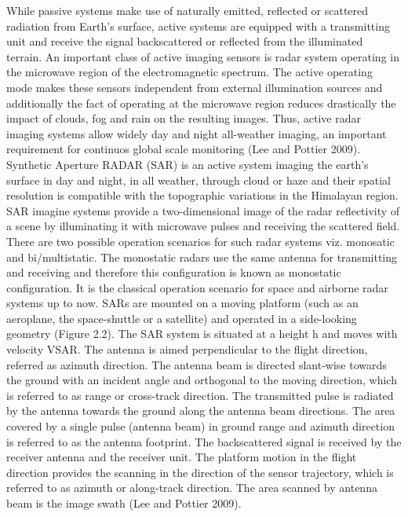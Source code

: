  While passive systems make use of naturally emitted, reflected or scattered radiation from Earth’s surface, active systems are equipped with a transmitting unit and receive the signal backscattered or reflected from the illuminated terrain. An important class of active imaging sensors is radar system operating in the microwave region of the electromagnetic spectrum. The active operating mode makes these sensors independent from external illumination sources and additionally the fact of operating at the microwave region reduces drastically the impact of clouds, fog and rain on the resulting images. Thus, active radar imaging systems allow widely day and night all-weather imaging, an important requirement for continuos global scale monitoring (Lee and Pottier 2009). Synthetic Aperture RADAR (SAR) is an active system imaging the earth’s surface in day and night, in all weather, through cloud or haze and their spatial resolution is compatible with the topographic variations in the Himalayan region. SAR imagine systems provide a two-dimensional image of the radar reflectivity of a scene by illuminating it with microwave pulses and receiving the scattered field. There are two possible operation scenarios for such radar systems viz. monosatic and bi/multistatic. 
The monostatic radars use the same antenna for transmitting and receiving and therefore this configuration is known as monostatic configuration. It is the classical operation scenario for space and airborne radar systems up to now. SARs are mounted on a moving platform (such as an aeroplane, the space-shuttle or a satellite) and operated in a side-looking geometry (Figure 2.2). The SAR system is situated at a height h and moves with velocity VSAR. The antenna is aimed perpendicular to the flight direction, referred as azimuth direction. The antenna beam is directed slant-wise towards the ground with an incident angle and orthogonal to the moving direction, which is referred to as range or cross-track direction. The transmitted pulse is radiated by the antenna towards the ground along the antenna beam directions. The area covered by a single pulse (antenna beam) in ground range and azimuth direction is referred to as the antenna footprint. The backscattered signal is received by the receiver antenna and the receiver unit. The platform motion in the flight direction provides the scanning in the direction of the sensor trajectory, which is referred to as azimuth or along-track direction. The area scanned by antenna beam is the image swath (Lee and Pottier 2009).
